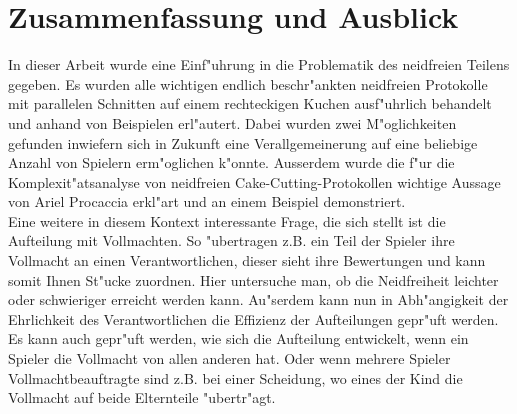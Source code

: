 \documentclass[11pt, a4paper, twoside]{article}
\numberwithin{equation}{section}
\begin{document}
\section{Zusammenfassung und Ausblick}
In dieser Arbeit wurde eine Einf"uhrung in die Problematik des neidfreien Teilens gegeben. Es wurden alle wichtigen endlich beschr"ankten neidfreien Protokolle mit parallelen Schnitten auf einem rechteckigen Kuchen ausf"uhrlich behandelt und anhand von Beispielen erl"autert. Dabei wurden zwei M"oglichkeiten gefunden inwiefern sich in Zukunft eine Verallgemeinerung auf eine beliebige Anzahl von Spielern erm"oglichen k"onnte. Ausserdem wurde die f"ur die Komplexit"atsanalyse von neidfreien Cake-Cutting-Protokollen wichtige Aussage von Ariel Procaccia erkl"art und an einem Beispiel demonstriert.\\Eine weitere in diesem Kontext interessante Frage, die sich stellt ist die Aufteilung mit Vollmachten. So "ubertragen z.B. ein Teil der Spieler ihre Vollmacht an einen Verantwortlichen, dieser sieht ihre Bewertungen und kann somit Ihnen St"ucke zuordnen. Hier untersuche man, ob die Neidfreiheit leichter oder schwieriger erreicht werden kann. Au"serdem kann nun in Abh"angigkeit der Ehrlichkeit des Verantwortlichen die Effizienz der Aufteilungen gepr"uft werden. Es kann auch gepr"uft werden, wie sich die Aufteilung entwickelt, wenn ein Spieler die Vollmacht von allen anderen hat. Oder wenn mehrere Spieler Vollmachtbeauftragte sind z.B. bei einer Scheidung, wo eines der Kind die Vollmacht auf beide Elternteile "ubertr"agt.\\
\newpage
\thispagestyle{empty}
\thispagestyle{plain}
\renewcommand{\refname}{Literaturverzeichnis}
\end{document}

